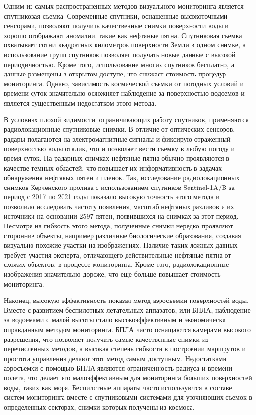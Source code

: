 Одним из самых распространенных методов визуального мониторинга является спутниковая съемка. Современные спутники, оснащенные высокоточными сенсорами, позволяют получить качественные снимки поверхности воды и хорошо отображают аномалии, такие как нефтяные пятна. Спутниковая съемка охватывает сотни квадратных километров поверхности Земли в одном снимке, а использование групп спутников позволяет получать новые данные с высокой периодичностью. Кроме того, использование многих спутников бесплатно, а данные размещены в открытом доступе, что снижает стоимость процедур мониторинга. Однако, зависимость космической съемки от погодных условий и времени суток значительно осложняет наблюдение за поверхностью водоемов и является существенным недостатком этого метода.

В условиях плохой видимости, ограничивающих работу спутников, применяются радиолокационные спутниковые снимки. В отличие от оптических сенсоров, радары полагаются на электромагнитные сигналы и фиксирую отраженный поверхностью воды отклик, что и позволяет вести съемку в любую погоду и время суток. На радарных снимках нефтяные пятна обычно проявляются в качестве темных областей, что повышает их информативность в задачах обнаружения нефтяных пятен и пленок.  Так, исследование радиолокационных снимков Керченского пролива с использованием спутников Sentinel-1A/B за период с 2017 по 2021 годы показало высокую точность этого метода и позволило исследовать частоту появления, масштаб нефтяных разливов и их источники на основании 2597 пятен, появившихся на снимках за этот период\cite{radiophoto}. Несмотря на гибкость этого метода, полученные снимки нередко проявляют сторонние объекты, например различные биологические образования, создавая визуально похожие участки на изображениях. Наличие таких ложных данных требует участия эксперта, отличающего действительные нефтяные пятна от схожих объектов, в процессе мониторинга. Кроме того, радиолокационные изображения значительно дороже, что еще больше повышает стоимость мониторинга.

Наконец, высокую эффективность показал метод аэросъемки поверхностей воды. Вместе с развитием беспилотных летательных аппаратов, или БПЛА, наблюдение за водоемами с малой высоты стало высокоэффективным и экономически оправданным методом мониторинга. БПЛА часто оснащаются камерами высокого разрешения, что позволяет получать самые качественные снимки из перечисленных методов, а высокая степень гибкости в построении маршрутов и простота управления делают этот метод самым доступным. Недостатками аэросъемки с помощью БПЛА являются ограниченность радиуса и времени полета, что делает его малоэффективным для мониторинга больших поверхностей воды, таких как моря. Беспилотные аппараты часто используются в составе систем мониторинга вместе с спутниковыми системами для уточняющих съемок в определенных секторах, снимки которых получены из космоса. 

